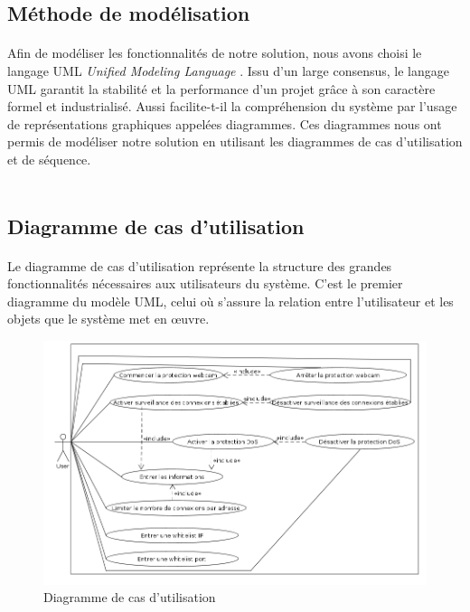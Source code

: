 \subsection{Méthode de modélisation}
      \paragraph{}
      Afin de modéliser les fonctionnalités de notre solution, nous avons choisi le langage UML \textit{Unified Modeling Language} \cite{I}. Issu d’un large consensus, le langage UML garantit la stabilité et la performance d’un projet grâce à son caractère formel et industrialisé. Aussi facilite-t-il la compréhension du système par l’usage de représentations graphiques appelées diagrammes. Ces diagrammes nous ont permis de modéliser notre solution en utilisant les diagrammes de cas d’utilisation et de séquence.\\ \\
\subsection{Diagramme de cas d'utilisation}
    \paragraph{}
	  Le diagramme de cas d'utilisation représente la structure des grandes fonctionnalités nécessaires aux
    utilisateurs du système. C'est le premier diagramme du modèle UML, celui où s'assure la relation entre l'utilisateur et les objets que le système met en œuvre. 

	  \begin{figure}[H]
		     \begin{center}
			\includegraphics[scale=0.5]{images/use_case.png}
		     \end{center}
		     \caption{Diagramme de cas d'utilisation}
		     \label{Diagramme de cas d'utilisation}
	  \end{figure}
	  
